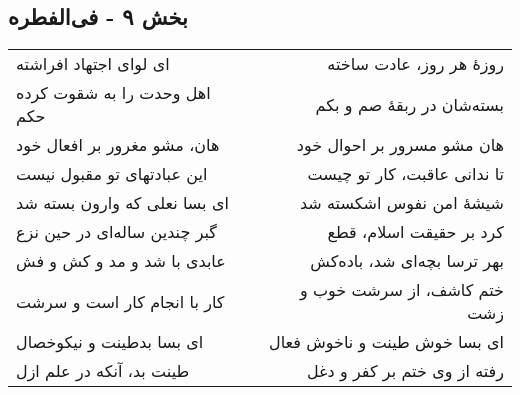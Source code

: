 \begin{center}
\section*{بخش ۹ - فی‌الفطره}
\label{sec:009}
\begin{longtable}{l p{0.5cm} r}
ای لوای اجتهاد افراشته
&&
روزهٔ هر روز، عادت ساخته
\\
اهل وحدت را به شقوت کرده حکم
&&
بسته‌شان در ربقهٔ صم و بکم
\\
هان، مشو مغرور بر افعال خود
&&
هان مشو مسرور بر احوال خود
\\
این عبادتهای تو مقبول نیست
&&
تا ندانی عاقبت، کار تو چیست
\\
ای بسا نعلی که وارون بسته شد
&&
شیشهٔ امن نفوس اشکسته شد
\\
گبر چندین ساله‌ای در حین نزع
&&
کرد بر حقیقت اسلام، قطع
\\
عابدی با شد و مد و کش و فش
&&
بهر ترسا بچه‌ای شد، باده‌کش
\\
کار با انجام کار است و سرشت
&&
ختم کاشف، از سرشت خوب و زشت
\\
ای بسا بدطینت و نیکوخصال
&&
ای بسا خوش طینت و ناخوش فعال
\\
طینت بد، آنکه در علم ازل
&&
رفته از وی ختم بر کفر و دغل
\\
\end{longtable}
\end{center}
